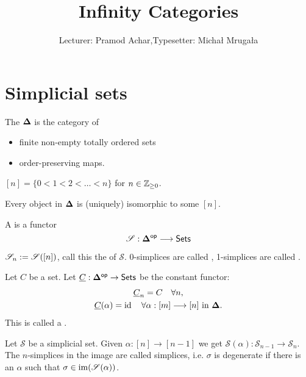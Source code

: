 

\def\CC{\mathcal C}
\def\CS{\mathcal S}
\def\CT{\mathcal T}
\def\Sing{\operatorname{Sing}}
\def\map{\operatorname{map}}
\def\Mor{\operatorname{Mor}}
\def\1b{\mathbb{1}}

\title{Infinity Categories}
\author{Lecturer: Pramod Achar,\quad Typesetter: Micha{\l} Mruga{\l}a}


\maketitle

\section{Simplicial sets}

\begin{definition}
	The  $\mathbf{\Delta}$ is the category of
	\begin{itemize}
		\item finite non-empty totally ordered sets
		\item order-preserving maps.
	\end{itemize}
\end{definition}
\begin{notation}
	$[n]=\{0<1<2<\dots<n\} $ for $n\in \mathbb Z_{\ge 0}$.
\end{notation}
Every object in $\mathbf{\Delta}$ is (uniquely) isomorphic to some $[n]$.
\begin{definition}
	A  is a functor
	\[
		\CS:\bb{\Delta}\op \to \Set
	\] 
\end{definition}
\begin{notation}
	$\CS_n \defeq \CS([n])$, call this the  of $\CS$. 0-simplices are called , 1-simplices are called .
\end{notation}
\begin{example}
	Let $C$ be a set. Let $\ul{C}:\bb{\Delta}\op\to \Set$ be the constant functor:
	\begin{gather*}
		\ul{C}_n = C\quad \forall n, \\
		\ul{C}(\alpha) = \id \quad \forall \alpha:[m]\to [n] \text{ in }\bb{\Delta}.
	\end{gather*}
	This is called a .
\end{example}
\begin{definition}
	Let $\CS$ be a simplicial set. Given $\alpha:[n]\to [n-1]$ we get $\CS(\alpha):\CS_{n-1}\to \CS_n$. The $n$-simplices in the image are called  simplices, i.e. $\sigma$ is degenerate if there is an $\alpha$ such that $\sigma\in \img(\CS(\alpha))$.
\end{definition}
